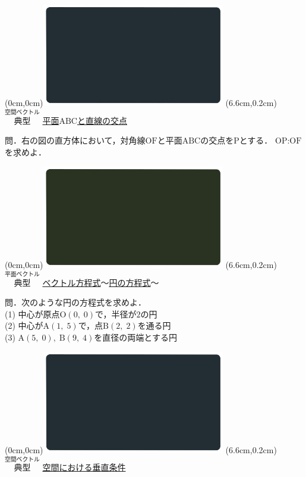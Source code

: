 \documentclass[10pt,
fleqn,
dvipdfmx,
uplatex
]{jsarticle}
\begin{document}
\at(0cm,0cm){\includegraphics[width=8cm,bb=0 0 1920 1080]{./youtube/thumbnails/templates/smart_background/空間ベクトル.jpeg}}
\at(6.6cm,0.2cm){\small\color{bradorange}$\overset{\text{空間ベクトル}}{\text{典型}}$}
{\color{orange}\LARGE\underline{平面$\text{ABC}$と直線の交点}}\vspace{0.3zw}

\Large 
問．右の図の直方体において，対角線$\text{OF}$と平面$\text{ABC}$の交点を$\text{P}$とする．
$\text{OP}:\text{OF}$を求めよ．


\newpage



\at(0cm,0cm){\includegraphics[width=8cm,bb=0 0 1920 1080]{./youtube/thumbnails/templates/smart_background/平面ベクトル.jpeg}}
\at(6.6cm,0.2cm){\small\color{bradorange}$\overset{\text{平面ベクトル}}{\text{典型}}$}
{\color{orange}\large\underline{ベクトル方程式$〜$円の方程式$〜$}}\vspace{0.3zw}

\normalsize 
問．次のような円の方程式を求めよ．\\
(1)  中心が原点$\text{O}\left(0,\;0\right)$で，半径が$2$の円\\
(2)  中心が$\text{A}\left(1,\;5\right)$で，点$\text{B}\left(2,\;2\right)$を通る円\\
(3)  $\text{A}\left(5,\;0\right),\;\text{B}\left(9,\;4\right)$を直径の両端とする円\\



\newpage



\at(0cm,0cm){\includegraphics[width=8cm,bb=0 0 1920 1080]{./youtube/thumbnails/templates/smart_background/空間ベクトル.jpeg}}
\at(6.6cm,0.2cm){\small\color{bradorange}$\overset{\text{空間ベクトル}}{\text{典型}}$}
{\color{orange}\LARGE\underline{空間における垂直条件}}\vspace{0.3zw}
\end{document}
